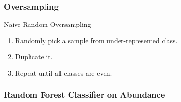 \documentclass{beamer}
\begin{document}
    \begin{frame}
        \frametitle{Oversampling}

        \begin{block}{Naive Random Oversampling}
            \begin{enumerate}
                \item Randomly pick a sample from under-represented class.
                \item Duplicate it.
                \item Repeat until all classes are even.
            \end{enumerate}
        \end{block}
    \end{frame}

    \subsubsection{Random Forest Classifier on Abundance}
\end{document}
